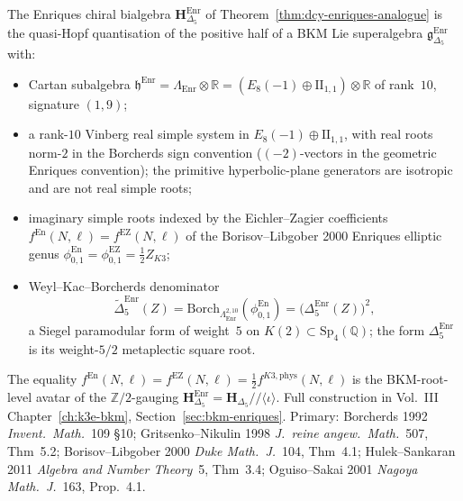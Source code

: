 \begin{theorem}
\label{thm:dcy-enriques-bkm}
The Enriques chiral bialgebra
$\mathbf{H}_{\Delta_5}^{\mathrm{Enr}}$ of
Theorem~\ref{thm:dcy-enriques-analogue} is the quasi-Hopf
quantisation of the positive half of a BKM Lie superalgebra
$\mathfrak{g}_{\Delta_5}^{\mathrm{Enr}}$ with:
\begin{itemize}
\item Cartan subalgebra
 $\mathfrak{h}^{\mathrm{Enr}} = \Lambda_{\mathrm{Enr}}\otimes\mathbb{R}
 = (E_8(-1)\oplus\mathrm{II}_{1,1})\otimes\mathbb{R}$ of rank~$10$,
 signature $(1,9)$;
\item a rank-$10$ Vinberg real simple system in
 \(E_8(-1)\oplus\mathrm{II}_{1,1}\), with real roots norm-$2$ in the
 Borcherds sign convention \textup{(}\((-2)\)-vectors in the geometric
 Enriques convention\textup{)}; the primitive hyperbolic-plane
 generators are isotropic and are not real simple roots;
\item imaginary simple roots indexed by the Eichler--Zagier
 coefficients \(f^{\mathrm{En}}(N,\ell)=f^{\mathrm{EZ}}(N,\ell)\) of the
 Borisov--Libgober 2000 Enriques elliptic genus
 \(\phi^{\mathrm{En}}_{0,1}=\phi^{\mathrm{EZ}}_{0,1}=\frac12 Z_{K3}\);
\item Weyl--Kac--Borcherds denominator
 \[
  \widetilde\Delta_5^{\mathrm{Enr}}(Z)
  =
  \mathrm{Borch}_{\Lambda^{2,10}_{\mathrm{Enr}}}
  (\phi^{\mathrm{En}}_{0,1})
  =
  \bigl(\Delta_5^{\mathrm{Enr}}(Z)\bigr)^2,
 \]
 a Siegel paramodular form of weight~$5$ on
 $K(2)\subset\mathrm{Sp}_4(\mathbb{Q})$; the form
 \(\Delta_5^{\mathrm{Enr}}\) is its weight-\(5/2\) metaplectic square
 root.
\end{itemize}
The equality
\(f^{\mathrm{En}}(N,\ell)=f^{\mathrm{EZ}}(N,\ell)=\frac12
f^{K3,\mathrm{phys}}(N,\ell)\) is the BKM-root-level avatar of the
$\mathbb{Z}/2$-gauging
$\mathbf{H}_{\Delta_5}^{\mathrm{Enr}} = \mathbf{H}_{\Delta_5}/\!/\langle\iota\rangle$.
Full construction in Vol.~III Chapter~\ref{ch:k3e-bkm},
Section~\ref{sec:bkm-enriques}.
Primary: Borcherds 1992 \emph{Invent.~Math.}~109 \S 10;
Gritsenko--Nikulin 1998 \emph{J.~reine angew.~Math.}~507, Thm~5.2;
Borisov--Libgober 2000 \emph{Duke Math.~J.}~104, Thm~4.1;
Hulek--Sankaran 2011 \emph{Algebra and Number Theory}~5, Thm~3.4;
Oguiso--Sakai 2001 \emph{Nagoya Math.~J.}~163, Prop.~4.1.
\end{theorem}

